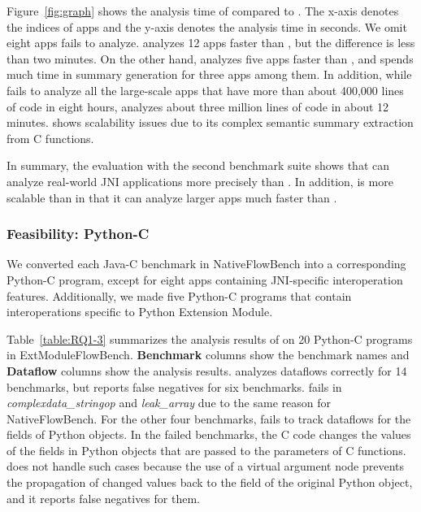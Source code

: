 Figure~\ref{fig:graph} shows the analysis time of \ours compared to \lees.  The
x-axis denotes the indices of apps and the y-axis denotes the analysis time in
seconds. We omit eight apps \lees fails to analyze.  \lees analyzes 12 apps
faster than \ours, but the difference is less than two minutes.  On the other
hand, \ours analyzes five apps faster than \lees, and \lees spends much time in
summary generation for three apps among them.  In addition, while \lees fails
to analyze all the large-scale apps that have more than about 400,000 lines of
code in eight hours, \ours analyzes about three million lines of code in about
12 minutes.  \lees shows scalability issues due to its complex semantic summary
extraction from C functions.

In summary, the evaluation with the second benchmark suite shows that \ours can
analyze real-world JNI applications more precisely than \lees.  In addition,
\ours is more scalable than \lees in that it can analyze larger apps much
faster than \lees.

\subsubsection{Feasibility: Python-C}


 We converted each Java-C
benchmark in NativeFlowBench into a corresponding Python-C program, except for
eight apps containing JNI-specific interoperation features. Additionally, we
made five Python-C programs that contain interoperations specific to Python
Extension Module.

Table~\ref{table:RQ1-3} summarizes the analysis results of \ours on 20 Python-C
programs in ExtModuleFlowBench.  {\bf Benchmark} columns show the benchmark
names and {\bf Dataflow} columns show the analysis results.  \ours analyzes
dataflows correctly for 14 benchmarks, but reports false negatives for six
benchmarks.  \ours fails in {\it complexdata\_stringop} and {\it leak\_array}
due to the same reason for NativeFlowBench.  For the other four benchmarks,
\ours fails to track dataflows for the fields of Python objects.  In the failed
benchmarks, the C code changes the values of the fields in Python objects that
are passed to the parameters of C functions.  \ours does not handle such cases
because the use of a virtual argument node prevents the propagation of changed
values back to the field of the original Python object, and it reports false
negatives for them.

